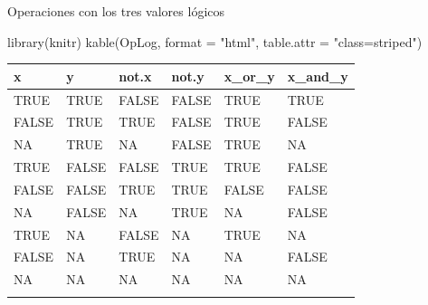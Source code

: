 \documentclass[
  ignorenonframetext,
  aspectratio=169,
  spanish,
]{beamer}
\newenvironment{Shaded}{\begin{snugshade}}{\end{snugshade}}
\newcommand{\AttributeTok}[1]{\textcolor[rgb]{0.40,0.45,0.13}{#1}}
\newcommand{\FunctionTok}[1]{\textcolor[rgb]{0.28,0.35,0.67}{#1}}
\newcommand{\NormalTok}[1]{\textcolor[rgb]{0.00,0.23,0.31}{#1}}
\newcommand{\StringTok}[1]{\textcolor[rgb]{0.13,0.47,0.30}{#1}}
\begin{document}
\begin{frame}[fragile]{Operaciones con los tres valores lógicos}
\label{operaciones-con-los-tres-valores-luxf3gicos}
\begin{Shaded}
\begin{Highlighting}[]
\FunctionTok{library}\NormalTok{(knitr) }
\FunctionTok{kable}\NormalTok{(OpLog, }\AttributeTok{format =} \StringTok{"html"}\NormalTok{, }\AttributeTok{table.attr =} \StringTok{"class=\textquotesingle{}striped\textquotesingle{}"}\NormalTok{) }
\end{Highlighting}
\end{Shaded}

\begin{longtable}[]{@{}llllll@{}}
\toprule\noalign{}
x & y & not.x & not.y & x\_or\_y & x\_and\_y \\
\midrule\noalign{}
\endhead
TRUE & TRUE & FALSE & FALSE & TRUE & TRUE \\
FALSE & TRUE & TRUE & FALSE & TRUE & FALSE \\
NA & TRUE & NA & FALSE & TRUE & NA \\
TRUE & FALSE & FALSE & TRUE & TRUE & FALSE \\
FALSE & FALSE & TRUE & TRUE & FALSE & FALSE \\
NA & FALSE & NA & TRUE & NA & FALSE \\
TRUE & NA & FALSE & NA & TRUE & NA \\
FALSE & NA & TRUE & NA & NA & FALSE \\
NA & NA & NA & NA & NA & NA \\
\bottomrule\noalign{}
\end{longtable}
\end{frame}
\end{document}
